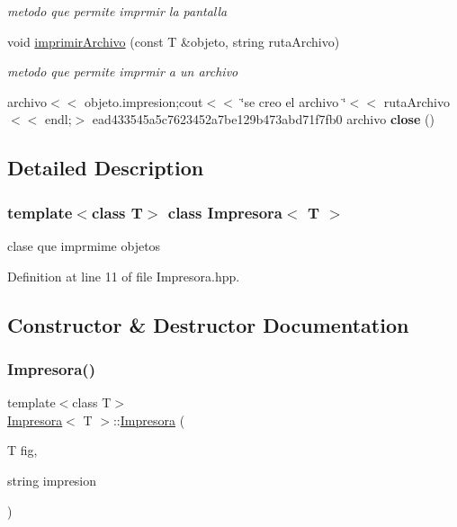 \begin{DoxyCompactItemize}
\begin{DoxyCompactList}\small\item\em metodo que permite imprmir la pantalla \end{DoxyCompactList}\item 
void \hyperlink{class_impresora_ac63e5482787086f73c351732f4731239}{imprimir\+Archivo} (const T \&objeto, string ruta\+Archivo)
\begin{DoxyCompactList}\small\item\em metodo que permite imprmir a un archivo \end{DoxyCompactList}\item 
\mbox{\label{class_impresora_a42a1a7c0a30c70b410f610c38fe68c1d}} 
archivo$<$$<$ objeto.\+impresion;cout$<$$<$ \char`\"{}se creo el archivo \char`\"{}$<$$<$ ruta\+Archivo$<$$<$ endl;$>$ ead433545a5c7623452a7be129b473abd71f7fb0 archivo {\bfseries close} ()
\end{DoxyCompactItemize}


\subsection{Detailed Description}
\subsubsection*{template$<$class T$>$\newline
class Impresora$<$ T $>$}

clase que imprmime objetos 

Definition at line 11 of file Impresora.\+hpp.



\subsection{Constructor \& Destructor Documentation}
\mbox{\label{class_impresora_a82093c181cb0601fc82dbbeff7247763}} 
\subsubsection{\texorpdfstring{Impresora()}{Impresora()}}
{\footnotesize\ttfamily template$<$class T$>$ \\
\hyperlink{class_impresora}{Impresora}$<$ T $>$\+::\hyperlink{class_impresora}{Impresora} (\begin{DoxyParamCaption}\item[{T}]{fig,  }\item[{string}]{impresion }\end{DoxyParamCaption})\hspace{0.3cm}{\ttfamily [inline]}}



